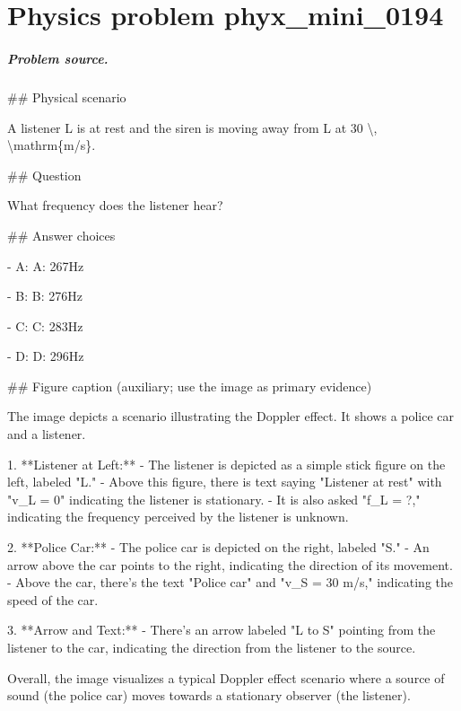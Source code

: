 
\chapter{Physics problem phyx\_mini\_0194}
\label{ch:PhyXMiniProblems_problem_phyx_mini_0194}

\paragraph{Problem source.}
\#\# Physical scenario

A listener L is at rest and the siren is moving away from L at 30 \textbackslash{}, \textbackslash{}mathrm\{m/s\}.

\#\# Question

What frequency does the listener hear?

\#\# Answer choices

- A: A: 267Hz

- B: B: 276Hz

- C: C: 283Hz

- D: D: 296Hz

\#\# Figure caption (auxiliary; use the image as primary evidence)

The image depicts a scenario illustrating the Doppler effect. It shows a police car and a listener.

1. **Listener at Left:**
   - The listener is depicted as a simple stick figure on the left, labeled "L."
   - Above this figure, there is text saying "Listener at rest" with "v\_L = 0" indicating the listener is stationary.
   - It is also asked "f\_L = ?," indicating the frequency perceived by the listener is unknown.

2. **Police Car:**
   - The police car is depicted on the right, labeled "S."
   - An arrow above the car points to the right, indicating the direction of its movement.
   - Above the car, there's the text "Police car" and "v\_S = 30 m/s," indicating the speed of the car.

3. **Arrow and Text:**
   - There’s an arrow labeled "L to S" pointing from the listener to the car, indicating the direction from the listener to the source.

Overall, the image visualizes a typical Doppler effect scenario where a source of sound (the police car) moves towards a stationary observer (the listener).

